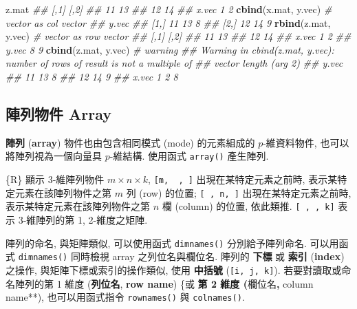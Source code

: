 \documentclass[
]{book}
\newenvironment{Shaded}{\begin{snugshade}}{\end{snugshade}}
\newcommand{\CommentTok}[1]{\textcolor[rgb]{0.56,0.35,0.01}{\textit{#1}}}
\newcommand{\KeywordTok}[1]{\textcolor[rgb]{0.13,0.29,0.53}{\textbf{#1}}}
\newcommand{\NormalTok}[1]{#1}
\begin{document}
\begin{Shaded}
\begin{Highlighting}[]
\NormalTok{z.mat}
\CommentTok{\#\#       [,1] [,2]}
\CommentTok{\#\#         11   13}
\CommentTok{\#\#         12   14}
\CommentTok{\#\# x.vec    1    2}
\KeywordTok{cbind}\NormalTok{(x.mat, y.vec) }\CommentTok{\# vector as col vector}
\CommentTok{\#\#            y.vec}
\CommentTok{\#\# [1,] 11 13     8}
\CommentTok{\#\# [2,] 12 14     9}
\KeywordTok{rbind}\NormalTok{(z.mat, y.vec) }\CommentTok{\# vector as row vector}
\CommentTok{\#\#       [,1] [,2]}
\CommentTok{\#\#         11   13}
\CommentTok{\#\#         12   14}
\CommentTok{\#\# x.vec    1    2}
\CommentTok{\#\# y.vec    8    9}
\KeywordTok{cbind}\NormalTok{(z.mat, y.vec) }\CommentTok{\# warning}
\CommentTok{\#\# Warning in cbind(z.mat, y.vec): number of rows of result is not a multiple of}
\CommentTok{\#\# vector length (arg 2)}
\CommentTok{\#\#             y.vec}
\CommentTok{\#\#       11 13     8}
\CommentTok{\#\#       12 14     9}
\CommentTok{\#\# x.vec  1  2     8}
\end{Highlighting}
\end{Shaded}

\hypertarget{ux9663ux5217ux7269ux4ef6-array}{%
\subsection{陣列物件 Array}\label{ux9663ux5217ux7269ux4ef6-array}}

\textbf{陣列}
(\textbf{array})
物件也由包含相同模式 (mode) 的元素組成的 \(p\)-維資料物件,
也可以將陣列視為一個向量具 \(p\)-維結構.
使用函式
\texttt{array()}
產生陣列.

\{R\} 顯示 \(3\)-維陣列物件 \(m \times n \times k\),
\texttt{{[}m,\ \ ,\ {]}} 出現在某特定元素之前時,
表示某特定元素在該陣列物件之第 \(m\) 列 (row) 的位置;
\texttt{{[}\ ,\ n,\ {]}} 出現在某特定元素之前時,
表示某特定元素在該陣列物件之第 \(n\) 欄 (column) 的位置, 依此類推.
\texttt{{[}\ ,\ ,\ k{]}} 表示 \(3\)-維陣列的第 1, 2-維度之矩陣.

陣列的命名, 與矩陣類似,
可以使用函式
\texttt{dimnames()} 分別給予陣列命名.
可以用函式 \texttt{dimnames()}
同時檢視 array 之列位名與欄位名.
陣列的
\textbf{下標} 或
\textbf{索引}
(\textbf{index})
之操作,
與矩陣下標或索引的操作類似,
使用
\textbf{中括號} (\texttt{{[}i,\ j,\ k{]}}).
若要對讀取或命名陣列的第 1 維度
(\textbf{列位名},
\textbf{row name})
\{或\textbf{
第 2 維度
(}欄位名\textbf{,
}column name**),
也可以用函式指令
\texttt{rownames()}
與
\texttt{colnames()}.
\end{document}
